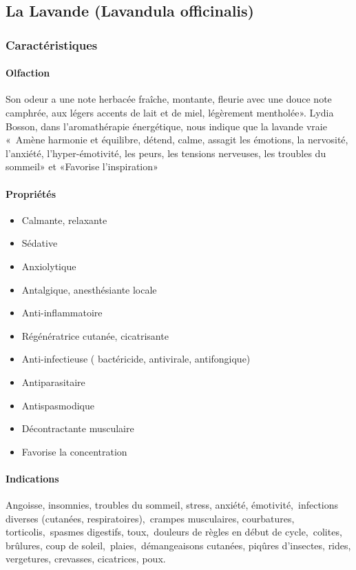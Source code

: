\documentclass[12pt,a4wide]{article}
\begin{document}
\subsection{La Lavande (Lavandula officinalis)}
\label{sec-4-7}
\subsubsection{Caractéristiques}
\label{sec-4-7-1}
\paragraph{Olfaction}
\label{sec-4-7-1-1}
Son odeur a une note herbacée fraîche, montante, fleurie avec une douce note camphrée, aux légers accents de lait et de miel, légèrement mentholée». Lydia Bosson, dans l'aromathérapie énergétique, nous indique que la lavande vraie « Amène harmonie et équilibre, détend, calme, assagit les émotions, la nervosité, l'anxiété, l'hyper-émotivité, les peurs, les tensions nerveuses, les troubles du sommeil» et «Favorise l'inspiration»
\paragraph{Propriétés}
\label{sec-4-7-1-2}
\begin{itemize}
\item Calmante, relaxante
\item Sédative
\item Anxiolytique
\item Antalgique, anesthésiante locale
\item Anti-inflammatoire
\item Régénératrice cutanée, cicatrisante
\item Anti-infectieuse ( bactéricide, antivirale, antifongique)
\item Antiparasitaire
\item Antispasmodique
\item Décontractante musculaire
\item Favorise la concentration
\end{itemize}

\paragraph{Indications}
\label{sec-4-7-1-3}
Angoisse, insomnies, troubles du sommeil, stress, anxiété, émotivité, infections diverses (cutanées, respiratoires), crampes musculaires, courbatures, torticolis, spasmes digestifs, toux, douleurs de règles en début de cycle, colites, brûlures, coup de soleil, plaies, démangeaisons cutanées, piqûres d'insectes, rides, vergetures, crevasses, cicatrices, poux.
\end{document}
